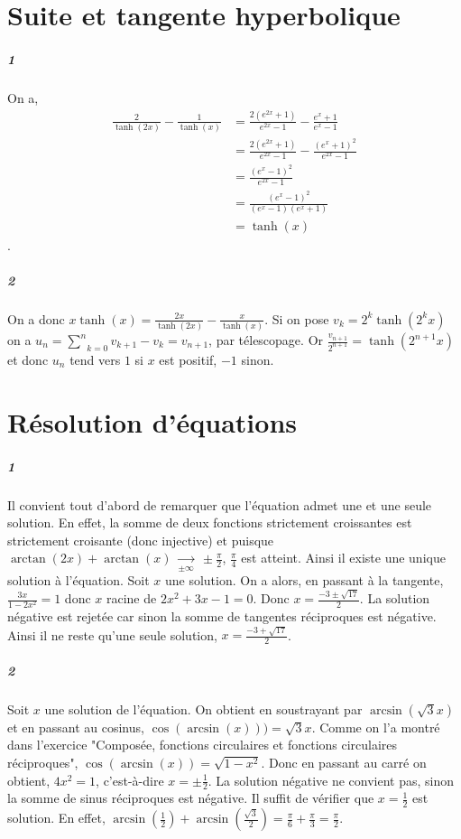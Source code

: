 \documentclass[10pt,a4paper]{article}
\begin{document}
\section{Suite et tangente hyperbolique}
\subparagraph{1} On a,
\begin{equation}
\begin{aligned}
\frac{2}{\tanh(2x)} - \frac{1}{\tanh(x)} &= \frac{2(e^{2x} + 1)}{e^{2x}-1} - \frac{e^x+1}{e^x-1} \\
 &=\frac{2(e^{2x} + 1)}{e^{2x}-1} - \frac{(e^x+1)^2}{e^{2x}-1} \\
 &=\frac{(e^x-1)^2}{e^{2x}-1} \\
 &=\frac{(e^x-1)^2}{(e^x-1)(e^x+1)} \\
 &=\tanh(x)
\end{aligned}
\end{equation}.

\subparagraph{2} On a donc $x \tanh(x) = \frac{2x}{\tanh(2x)} - \frac{x}{\tanh(x)}$. Si on pose $v_k = 2^k \tanh(2^kx)$ on a $u_n = \underset{k=0}{\overset{n}{\sum}} v_{k+1} - v_k = v_{n+1}$, par télescopage. Or $\frac{v_{n+1}}{2^{n+1}} = \tanh(2^{n+1}x)$ et donc $u_n$ tend vers $1$ si $x$ est positif, $-1$ sinon.

\section{Résolution d'équations}
\subparagraph{1}Il convient tout d'abord de remarquer que l'équation admet une et une seule solution. En effet, la somme de deux fonctions strictement croissantes est strictement croisante (donc injective) et puisque $\arctan(2x) + \arctan(x) \ \underset{\pm \infty}{\longrightarrow} \ \pm \frac{\pi}{2}$, $\frac{\pi}{4}$ est atteint. Ainsi il existe une unique solution à l'équation. Soit $x$ une solution. On a alors, en passant à la tangente, $\frac{3x}{1-2x^2} = 1$ donc $x$ racine de $2x^2+3x-1=0$. Donc $x = \frac{-3 \pm \sqrt{17}}{2}$. La solution négative est rejetée car sinon la somme de tangentes réciproques est négative. Ainsi il ne reste qu'une seule solution, $x = \frac{-3 + \sqrt{17}}{2}$.

\subparagraph{2} Soit $x$ une solution de l'équation. On obtient en soustrayant par $\arcsin(\sqrt{3}x)$ et en passant au cosinus, $\cos(\arcsin(x))) = \sqrt{3}x$. Comme on l'a montré dans l'exercice "Composée, fonctions circulaires et fonctions circulaires réciproques", $\cos(\arcsin(x)) = \sqrt{1 - x^2}$. Donc en passant au carré on obtient, $4x^2 = 1$, c'est-à-dire $x = \pm \frac{1}{2}$. La solution négative ne convient pas, sinon la somme de sinus réciproques est négative. Il suffit de vérifier que $x = \frac{1}{2}$ est solution. En effet, $\arcsin(\frac{1}{2}) + \arcsin(\frac{\sqrt{3}}{2}) = \frac{\pi}{6} + \frac{\pi}{3} = \frac{\pi}{2}$.
\end{document}
